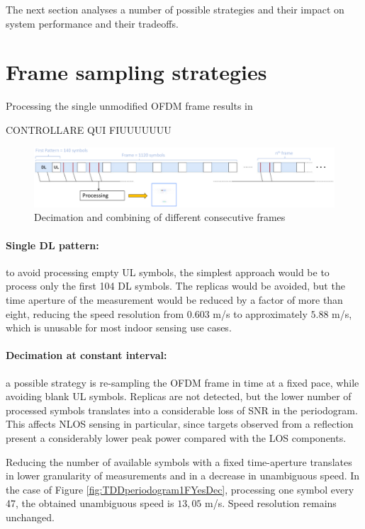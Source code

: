 	The next section analyses a number of possible strategies and their impact on system performance and their tradeoffs.    

\section{Frame sampling strategies}

	Processing the single unmodified OFDM frame results in 
	
	\alert{CONTROLLARE QUI FIUUUUUUU}

    \begin{figure}[H]
        \centering
        \includegraphics[width=1\textwidth]{Images/TDDprocessing/TDDstrategies.eps}
        \caption{Decimation and combining of different consecutive frames}
        \label{fig:TDDstrategies}
    \end{figure}

    \paragraph{Single DL pattern:}
    to avoid processing empty UL symbols, the simplest approach would be to process only the first 104 DL symbols. The replicas would be avoided, but the time aperture of the measurement would be reduced by a factor of more than eight, reducing the speed resolution from $0.603$ m/s to approximately $5.88$ m/s, which is unusable for most indoor sensing use cases.
    
    \paragraph{Decimation at constant interval:}
     a possible strategy is re-sampling the OFDM frame in time at a fixed pace, while avoiding blank UL symbols. Replicas are not detected, but the lower number of processed symbols translates into a considerable loss of SNR in the periodogram. This affects NLOS sensing in particular, since targets observed from a reflection present a considerably lower peak power compared with the LOS components.

     Reducing the number of available symbols with a fixed time-aperture translates in lower granularity of measurements and in a decrease in unambiguous speed. \protect\newline In the case of Figure \ref{fig:TDDperiodogram1FYesDec}, processing one symbol every 47, the obtained unambiguous speed is $13,05$ m/s. \protect\newline Speed resolution remains unchanged.
    
